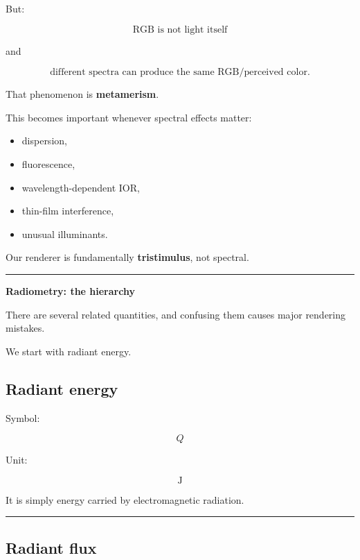 But:

\[
\boxed{\text{RGB is not light itself}}
\]

and

\[
\boxed{\text{different spectra can produce the same RGB/perceived color}}.
\]

That phenomenon is \textbf{metamerism}.

This becomes important whenever spectral effects matter:

\begin{itemize}
\tightlist
\item
  dispersion,
\item
  fluorescence,
\item
  wavelength-dependent IOR,
\item
  thin-film interference,
\item
  unusual illuminants.
\end{itemize}

Our renderer is fundamentally \textbf{tristimulus}, not spectral.

\begin{center}\rule{0.5\linewidth}{0.5pt}\end{center}

\textbf{Radiometry: the hierarchy}

There are several related quantities, and confusing them causes major rendering mistakes.

We start with radiant energy.

\subsection{Radiant energy}\label{03-visual-computing-i-ch004-radiant-energy}

\hypertarget{03-visual-computing-i-ch004-radiant-energy}{}

Symbol:

\[
Q
\]

Unit:

\[
\mathrm J
\]

It is simply energy carried by electromagnetic radiation.

\begin{center}\rule{0.5\linewidth}{0.5pt}\end{center}

\subsection{Radiant flux}\label{03-visual-computing-i-ch004-radiant-flux}

